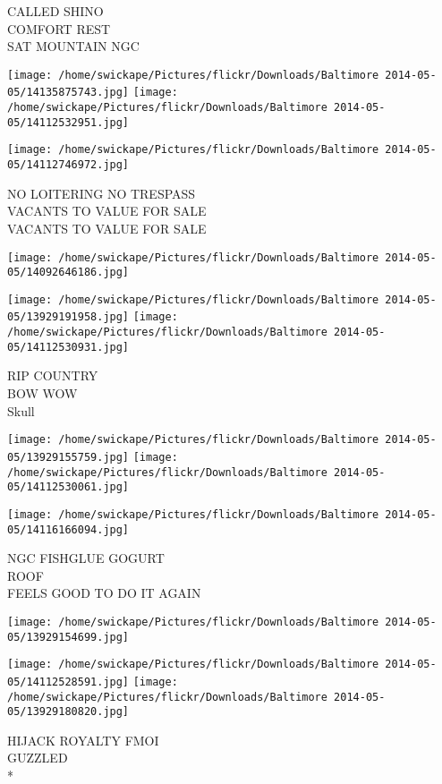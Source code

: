 \documentclass[10pt,letterpaper]{article}
\begin{document}
CALLED SHINO\\
COMFORT REST\\
SAT MOUNTAIN NGC
\pagebreak

\texttt{[image: /home/swickape/Pictures/flickr/Downloads/Baltimore 2014-05-05/14135875743.jpg]}
\texttt{[image: /home/swickape/Pictures/flickr/Downloads/Baltimore 2014-05-05/14112532951.jpg]}

\texttt{[image: /home/swickape/Pictures/flickr/Downloads/Baltimore 2014-05-05/14112746972.jpg]}

NO LOITERING NO TRESPASS\\
VACANTS TO VALUE FOR SALE\\
VACANTS TO VALUE FOR SALE
\pagebreak

\texttt{[image: /home/swickape/Pictures/flickr/Downloads/Baltimore 2014-05-05/14092646186.jpg]}

\vspace{0.25in}
\texttt{[image: /home/swickape/Pictures/flickr/Downloads/Baltimore 2014-05-05/13929191958.jpg]}
\texttt{[image: /home/swickape/Pictures/flickr/Downloads/Baltimore 2014-05-05/14112530931.jpg]}

RIP COUNTRY\\
BOW WOW\\
Skull
\pagebreak

\texttt{[image: /home/swickape/Pictures/flickr/Downloads/Baltimore 2014-05-05/13929155759.jpg]}
\texttt{[image: /home/swickape/Pictures/flickr/Downloads/Baltimore 2014-05-05/14112530061.jpg]}

\vspace{0.25in}
\texttt{[image: /home/swickape/Pictures/flickr/Downloads/Baltimore 2014-05-05/14116166094.jpg]}

NGC FISHGLUE GOGURT\\
ROOF\\
FEELS GOOD TO DO IT AGAIN
\pagebreak

\texttt{[image: /home/swickape/Pictures/flickr/Downloads/Baltimore 2014-05-05/13929154699.jpg]}

\vspace{0.25in}
\texttt{[image: /home/swickape/Pictures/flickr/Downloads/Baltimore 2014-05-05/14112528591.jpg]}
\texttt{[image: /home/swickape/Pictures/flickr/Downloads/Baltimore 2014-05-05/13929180820.jpg]}

HIJACK ROYALTY FMOI\\
GUZZLED\\
*
\pagebreak
\end{document}
